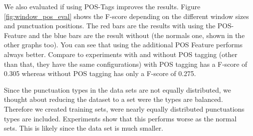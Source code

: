 We also evaluated if using POS-Tags improves the results. Figure \ref{fig:window_pos_eval} shows the F-score depending on the different window sizes and punctuation positions. The red bars are the results with using the POS-Feature and the blue bars are the result without (the normals one, shown in the other graphs too).
You can see that using the additional POS Feature performs always better. 
Compare to experiments with and without POS tagging (other than that, they have the same configurations) with POS tagging has a F-score of 0.305 whereas without POS tagging has only a F-score of 0.275.

Since the punctuation types in the data sets are not equally distributed, we thought about reducing the dataset to a set were the types are balanced. Therefore we created training sets, were nearly equally distributed punctuations types are included. Experiments show that this performs worse as the normal sets. This is likely since the data set is much smaller.
